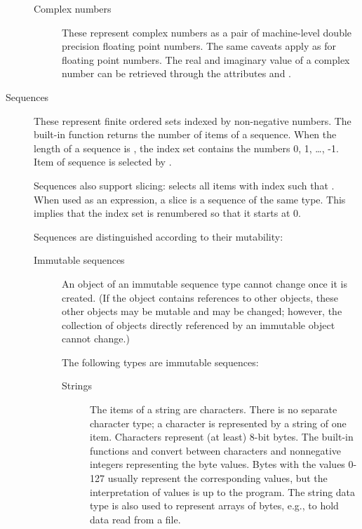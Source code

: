 \begin{description}
\begin{description}
\item[Complex numbers]
These represent complex numbers as a pair of machine-level double
precision floating point numbers.  The same caveats apply as for
floating point numbers.  The real and imaginary value of a complex
number  can be retrieved through the attributes 
and .

\end{description} %

\item[Sequences]
These represent finite ordered sets indexed by non-negative numbers.
The built-in function  returns the
number of items of a sequence.
When the length of a sequence is , the
index set contains the numbers 0, 1, \ldots, -1.  Item
 of sequence  is selected by .

Sequences also support slicing: 
selects all items with index  such that  \code{<=}
 \code{<} .  When used as an expression, a slice is a
sequence of the same type.  This implies that the index set is
renumbered so that it starts at 0.

Sequences are distinguished according to their mutability:

\begin{description}

\item[Immutable sequences]
An object of an immutable sequence type cannot change once it is
created.  (If the object contains references to other objects,
these other objects may be mutable and may be changed; however,
the collection of objects directly referenced by an immutable object
cannot change.)

The following types are immutable sequences:

\begin{description}

\item[Strings]
The items of a string are characters.  There is no separate
character type; a character is represented by a string of one item.
Characters represent (at least) 8-bit bytes.  The built-in
functions  and
 convert between characters and
nonnegative integers representing the byte values.  Bytes with the
values 0-127 usually represent the corresponding \ASCII{} values, but
the interpretation of values is up to the program.  The string
data type is also used to represent arrays of bytes, e.g., to hold data
read from a file.


\end{description}
\end{description}
\end{description}
